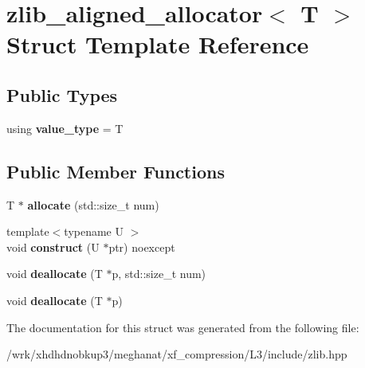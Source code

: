 \hypertarget{structzlib__aligned__allocator}{\section{zlib\-\_\-aligned\-\_\-allocator$<$ T $>$ Struct Template Reference}
\label{structzlib__aligned__allocator}
}
\subsection*{Public Types}
\begin{DoxyCompactItemize}
\item 
\hypertarget{structzlib__aligned__allocator_adfcc99fcd81e0b0c4dbd26ea51cb9986}{using {\bfseries value\-\_\-type} = T}\label{structzlib__aligned__allocator_adfcc99fcd81e0b0c4dbd26ea51cb9986}

\end{DoxyCompactItemize}
\subsection*{Public Member Functions}
\begin{DoxyCompactItemize}
\item 
\hypertarget{structzlib__aligned__allocator_a7bb6564c8ff34ec174e22a82e3259318}{T $\ast$ {\bfseries allocate} (std\-::size\-\_\-t num)}\label{structzlib__aligned__allocator_a7bb6564c8ff34ec174e22a82e3259318}

\item 
\hypertarget{structzlib__aligned__allocator_a536bca0042d96f416eec564fedc24dcd}{{\footnotesize template$<$typename U $>$ }\\void {\bfseries construct} (U $\ast$ptr) noexcept}\label{structzlib__aligned__allocator_a536bca0042d96f416eec564fedc24dcd}

\item 
\hypertarget{structzlib__aligned__allocator_a2cc7874853131a3de9a8947075f6237b}{void {\bfseries deallocate} (T $\ast$p, std\-::size\-\_\-t num)}\label{structzlib__aligned__allocator_a2cc7874853131a3de9a8947075f6237b}

\item 
\hypertarget{structzlib__aligned__allocator_a193f6feac7c4efcaae2ed95dbb169d11}{void {\bfseries deallocate} (T $\ast$p)}\label{structzlib__aligned__allocator_a193f6feac7c4efcaae2ed95dbb169d11}

\end{DoxyCompactItemize}


The documentation for this struct was generated from the following file\-:\begin{DoxyCompactItemize}
\item 
/wrk/xhdhdnobkup3/meghanat/xf\-\_\-compression/\-L3/include/zlib.\-hpp\end{DoxyCompactItemize}
